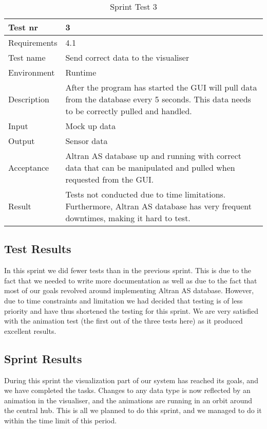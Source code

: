 \documentclass[../document]{subfiles}
\begin{document}
\begin{table}[H]
\caption{Sprint Test 3}
\centering
\begin{tabularx}{\textwidth}{|l|X|}
\hline
Test nr
&3
\\ \hline Requirements
&4.1
\\ \hline Test name
&Send correct data to the visualiser
\\ \hline Environment
&Runtime
\\ \hline Description
&After the program has started the GUI will pull data from the database every 5 seconds. This data needs to be correctly pulled and handled.
\\ \hline Input
&Mock up data
\\ \hline Output
&Sensor data
\\ \hline Acceptance
&\gls{Altran} AS database up and running with correct data that can be manipulated and pulled when requested from the GUI. 
\\ \hline Result
&Tests not conducted due to time limitations. Furthermore, \gls{Altran} AS database has very frequent downtimes, making it hard to test.
\\ \hline 
\end{tabularx}
\end{table}

\subsection{Test Results}
In this sprint we did fewer tests than in the previous sprint. This is due to the fact that we needed to write more documentation as well as due to the fact that most of our goals revolved around implementing \gls{Altran} AS database. However, due to time constraints and limitation we had decided that testing is of less priority and have thus shortened the testing for this sprint. We are very satisfied with the animation test (the first out of the three tests here) as it produced excellent results.

\subsection{Sprint Results}
During this sprint the visualization part of our system has reached its goals, and we have completed the tasks. Changes to any data type is now reflected by an animation in the visualiser, and the animations are running in an orbit around the central hub. This is all we planned to do this sprint, and we managed to do it within the time limit of this period. 
\end{document}
